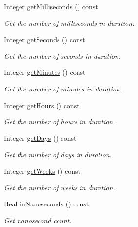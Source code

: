\begin{DoxyCompactItemize}
Integer \hyperlink{classlibrary_1_1physics_1_1time_1_1_duration_aac5063bb791db96348e23784106a4eba}{get\+Milliseconds} () const
\begin{DoxyCompactList}\small\item\em Get the number of milliseconds in duration. \end{DoxyCompactList}\item 
Integer \hyperlink{classlibrary_1_1physics_1_1time_1_1_duration_a98388bab81d1d5550532fdedaa08635c}{get\+Seconds} () const
\begin{DoxyCompactList}\small\item\em Get the number of seconds in duration. \end{DoxyCompactList}\item 
Integer \hyperlink{classlibrary_1_1physics_1_1time_1_1_duration_a2c8a5767f1a0add4999c649001cdb838}{get\+Minutes} () const
\begin{DoxyCompactList}\small\item\em Get the number of minutes in duration. \end{DoxyCompactList}\item 
Integer \hyperlink{classlibrary_1_1physics_1_1time_1_1_duration_a05ef46de76556cd571fd8a218dc3b24f}{get\+Hours} () const
\begin{DoxyCompactList}\small\item\em Get the number of hours in duration. \end{DoxyCompactList}\item 
Integer \hyperlink{classlibrary_1_1physics_1_1time_1_1_duration_a06ffb87b3c946a64a69000784488ab5c}{get\+Days} () const
\begin{DoxyCompactList}\small\item\em Get the number of days in duration. \end{DoxyCompactList}\item 
Integer \hyperlink{classlibrary_1_1physics_1_1time_1_1_duration_a11cf17341b43110b443ffd150571f43c}{get\+Weeks} () const
\begin{DoxyCompactList}\small\item\em Get the number of weeks in duration. \end{DoxyCompactList}\item 
Real \hyperlink{classlibrary_1_1physics_1_1time_1_1_duration_a45aa358d61481356dd591290d6ab3691}{in\+Nanoseconds} () const
\begin{DoxyCompactList}\small\item\em Get nanosecond count. \end{DoxyCompactList}\item 

\end{DoxyCompactItemize}
